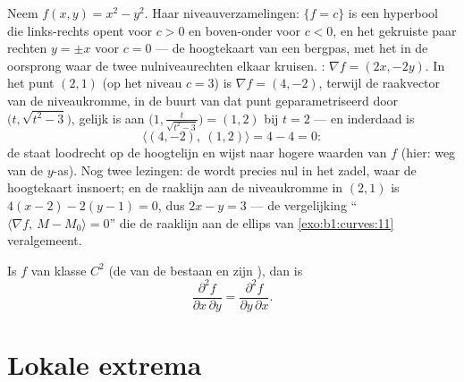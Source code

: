 \begin{example}
\label{ex:b1:multivar:levelcurves}
Neem $f(x, y) = x^2 - y^2$. Haar niveauverzamelingen: $\{f = c\}$
is een hyperbool die links-rechts opent voor $c > 0$ en
boven-onder voor $c < 0$, en het gekruiste paar rechten $y = \pm x$
voor $c = 0$ --- de hoogtekaart van een bergpas, met het 
in de oorsprong waar de twee nulniveaurechten elkaar kruisen.
: $\nabla f = (2x, -2y)$. In het punt $(2, 1)$ (op het
niveau $c = 3$) is $\nabla f = (4, -2)$, terwijl de raakvector van
de niveaukromme, in de buurt van dat punt geparametriseerd door
$\bigl(t, \sqrt{t^2 - 3}\bigr)$, gelijk is aan $\bigl(1,
\frac{t}{\sqrt{t^2 - 3}}\bigr) = (1, 2)$ bij $t = 2$ --- en
inderdaad is
\[
\langle (4, -2),\ (1, 2)\rangle = 4 - 4 = 0 :
\]
de  staat loodrecht op de hoogtelijn en wijst naar hogere
waarden van $f$ (hier: weg van de $y$-as). Nog twee lezingen: de
 wordt precies nul in het zadel, waar de hoogtekaart
insnoert; en de raaklijn aan de niveaukromme in $(2,1)$ is $4(x -
2) - 2(y - 1) = 0$, dus $2x - y = 3$ --- de vergelijking
``$\langle \nabla f,\ M - M_0\rangle = 0$'' die de raaklijn aan de
ellips van \cref{exo:b1:curves:11} veralgemeent.
\end{example}

\begin{theorem}[Schwarz]\label{thm:b1:multivar:schwarz}
Is $f$ van klasse $C^2$ (de  van de  bestaan en zijn ), dan is
\[
\frac{\partial^2 f}{\partial x\,\partial y}
= \frac{\partial^2 f}{\partial y\,\partial x} .
\]
\end{theorem}
\admitted

\section{Lokale extrema}

